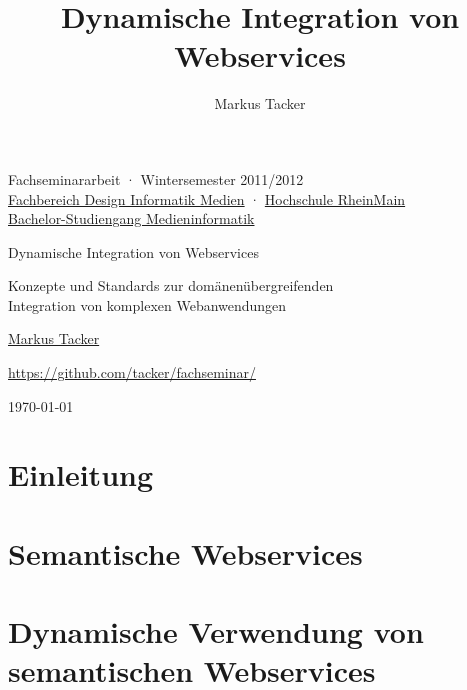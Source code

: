\documentclass[10pt,a4paper]{article}
\begin{document}
\author{Markus Tacker}
\title{Dynamische Integration von Webservices}

\begin{center}

\begin{small}Fachseminararbeit · Wintersemester 2011/2012\\\href{http://www.hs-rm.de/dcsm}{Fachbereich Design Informatik Medien} · \href{http://www.hs-rm.de/}{Hochschule RheinMain}\\\href{http://www.hs-rm.de/medieninformatik}{Bachelor-Studiengang Medieninformatik}\end{small}

\bigskip

\begin{huge}Dynamische Integration von Webservices\end{huge}

\begin{small}Konzepte und Standards zur domänenübergreifenden\\Integration von komplexen Webanwendungen\end{small}

\bigskip

\begin{large}\href{http://markusstudiert.de/}{Markus Tacker}\end{large}

\begin{small}\url{https://github.com/tacker/fachseminar/}\end{small}

\today

\end{center}



\section{Einleitung}
\label{l:einleitung}


\section{Semantische Webservices}
\label{l:sem-web-ser}


\section{Dynamische Verwendung von semantischen Webservices}
\label{l:loesungen}

\end{document}
